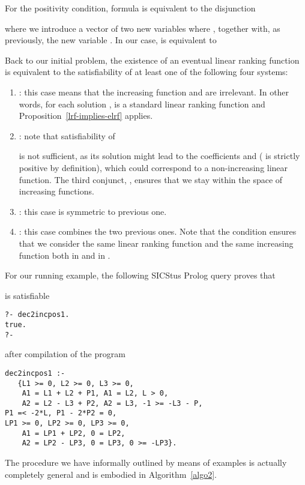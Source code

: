 \documentclass{acm_proc_article-sp}
\begin{document}
For the positivity condition,
formula  is equivalent to the disjunction

where we introduce a vector  of
two new variables where
,  together
with, as previously, the new variable .
In our case,  is equivalent to


Back to our initial problem, the existence of an eventual linear
ranking function is equivalent to the satisfiability of at least one
of the following four systems:
\begin{enumerate}
\item
:
this case means that the increasing function
and  are irrelevant. In other words, for each solution ,
 is a standard linear ranking function
and Proposition~\ref{lrf-implies-elrf} applies.

\item
:
note that satisfiability of

is not sufficient, as its solution might lead to the coefficients
 and 
( is strictly positive by definition),
which could correspond to a non-increasing linear function.
The third conjunct, ,
ensures that we stay within the space of increasing functions.

\item
:
this case is symmetric to previous one.

\item
:
this case combines the two previous ones.
Note that the condition ensures that we consider the same linear
ranking function and the same increasing function both in  and
in .
\end{enumerate}

For our running example, the following SICStus Prolog query
proves that

is satisfiable
\begin{verbatim}
?- dec2incpos1.
true.
?-
\end{verbatim}
after compilation of the program
\begin{verbatim}
dec2incpos1 :-
   {L1 >= 0, L2 >= 0, L3 >= 0,
    A1 = L1 + L2 + P1, A1 = L2, L > 0,
    A2 = L2 - L3 + P2, A2 = L3, -1 >= -L3 - P,
P1 =< -2*L, P1 - 2*P2 = 0,
LP1 >= 0, LP2 >= 0, LP3 >= 0,
    A1 = LP1 + LP2, 0 = LP2,
    A2 = LP2 - LP3, 0 = LP3, 0 >= -LP3}.
\end{verbatim}

The procedure we have informally outlined by means of examples is
actually completely general and is embodied in Algorithm~\ref{algo2}.
\end{document}
